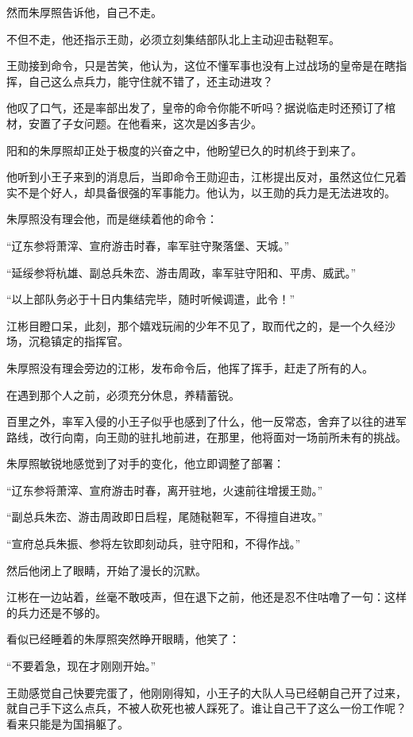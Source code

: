 \begin{multicols}{\theparacolNo}
然而朱厚照告诉他，自己不走。

不但不走，他还指示王勋，必须立刻集结部队北上主动迎击鞑靼军。

王勋接到命令，只是苦笑，他认为，这位不懂军事也没有上过战场的皇帝是在瞎指挥，自己这么点兵力，能守住就不错了，还主动进攻？

他叹了口气，还是率部出发了，皇帝的命令你能不听吗？据说临走时还预订了棺材，安置了子女问题。在他看来，这次是凶多吉少。

阳和的朱厚照却正处于极度的兴奋之中，他盼望已久的时机终于到来了。

他听到小王子来到的消息后，当即命令王勋迎击，江彬提出反对，虽然这位仁兄着实不是个好人，却具备很强的军事能力。他认为，以王勋的兵力是无法进攻的。

朱厚照没有理会他，而是继续着他的命令：

“辽东参将萧滓、宣府游击时春，率军驻守聚落堡、天城。”

“延绥参将杭雄、副总兵朱峦、游击周政，率军驻守阳和、平虏、威武。”

“以上部队务必于十日内集结完毕，随时听候调遣，此令！”

江彬目瞪口呆，此刻，那个嬉戏玩闹的少年不见了，取而代之的，是一个久经沙场，沉稳镇定的指挥官。

朱厚照没有理会旁边的江彬，发布命令后，他挥了挥手，赶走了所有的人。

在遇到那个人之前，必须充分休息，养精蓄锐。

百里之外，率军入侵的小王子似乎也感到了什么，他一反常态，舍弃了以往的进军路线，改行向南，向王勋的驻扎地前进，在那里，他将面对一场前所未有的挑战。

朱厚照敏锐地感觉到了对手的变化，他立即调整了部署：

“辽东参将萧滓、宣府游击时春，离开驻地，火速前往增援王勋。”

“副总兵朱峦、游击周政即日启程，尾随鞑靼军，不得擅自进攻。”

“宣府总兵朱振、参将左钦即刻动兵，驻守阳和，不得作战。”

然后他闭上了眼睛，开始了漫长的沉默。

江彬在一边站着，丝毫不敢吱声，但在退下之前，他还是忍不住咕噜了一句：这样的兵力还是不够的。

看似已经睡着的朱厚照突然睁开眼睛，他笑了：

“不要着急，现在才刚刚开始。”

王勋感觉自己快要完蛋了，他刚刚得知，小王子的大队人马已经朝自己开了过来，就自己手下这么点兵，不被人砍死也被人踩死了。谁让自己干了这么一份工作呢？看来只能是为国捐躯了。


\end{multicols}
